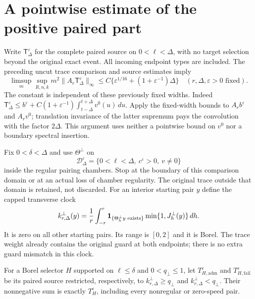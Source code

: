 \section{A pointwise estimate of the positive paired part}
\label{sec:v102-transverse-height}
Write $\mathsf T_\Delta^\varepsilon$ for the complete paired source
on $0<\ell<\Delta$, with no target selection beyond the original
exact event. All incoming endpoint types are included. The preceding
uncut trace comparison and source estimates imply
\begin{equation}\label{eq:v102-paired-average}
 \limsup_m\sup_{R,n,k}m^2
       \|A_r\mathsf T_\Delta^\varepsilon\|_\infty
       \le C\{\varepsilon^{1/16}+(1+\varepsilon^{-1})\Delta\}
 \quad(r,\Delta,\varepsilon>0\text{ fixed}).
\end{equation}
The constant is independent of these previously fixed widths.
Indeed $\mathsf T_\Delta^\varepsilon\le b^\varepsilon+
C(1+\varepsilon^{-1})\int_{t-\Delta}^{t+\Delta}v^0(u)\,du$.
Apply the fixed-width bounds to $A_rb^\varepsilon$ and $A_rv^0$;
translation invariance of the latter supremum pays the convolution
with the factor $2\Delta$. This argument uses neither a pointwise
bound on $v^0$ nor a boundary spectral insertion.

Fix $0<\delta<\Delta$ and use $\Theta^\perp$ on
\[
 \mathcal D_\Delta^\varepsilon
  =\{0<\ell<\Delta,\ c^\varepsilon>0,\ v\ne0\}
\]
inside the regular pairing chambers. Stop at the boundary of this
comparison domain or at an actual loss of chamber regularity.
The original trace outside that domain is retained, not discarded.
For an interior starting pair $y$ define the capped transverse clock
\begin{equation}\label{eq:v102-clock}
 k_{r,\Delta}^\perp(y)
  =\frac1r\int_{-r}^r
       \one_{\{\Theta_h^\perp y\text{ exists}\}}
                        \min\{1,J_h^\perp(y)\}\,dh.
\end{equation}
It is zero on all other starting pairs. Its range is $[0,2]$ and
it is Borel. The trace weight already contains the original guard
at both endpoints; there is no extra guard mismatch in this clock.

For a Borel selector $H$ supported on $\ell\le\delta$ and
$0<q_\perp\le1$, let $T_{H,\mathrm{adm}}^\varepsilon$ and
$T_{H,\mathrm{fail}}^\varepsilon$ be its paired source restricted,
respectively, to $k_{r,\Delta}^\perp\ge q_\perp$ and
$k_{r,\Delta}^\perp<q_\perp$. Their nonnegative sum is exactly
$T_H^\varepsilon$, including every nonregular or zero-speed pair.

